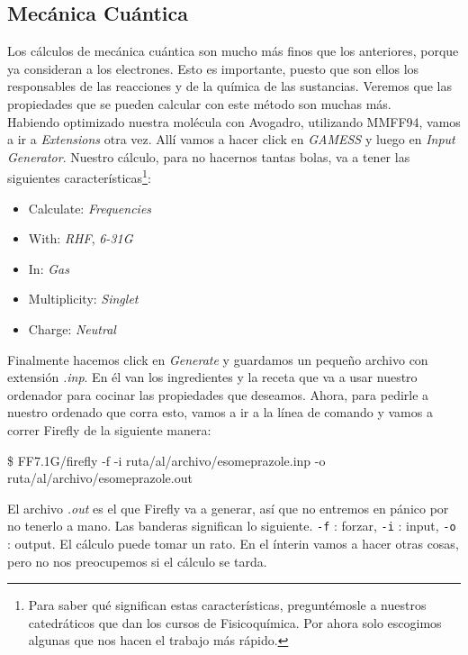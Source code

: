 \documentclass[10pt,letterpaper]{article}
\newcommand{\inlinecode}[1]{
\colorbox{light-gray}{\texttt{#1}}
}
\newenvironment{Code}
{
\begin{lrbox}{\selvestebox}%
\begin{minipage}{\dimexpr\columnwidth-2\fboxsep\relax}
\fontfamily{\ttdefault}\selectfont
}
{\end{minipage}\end{lrbox}%
\begin{center}
\colorbox{light-gray}{\usebox{\selvestebox}}
\end{center}
}
\begin{document}
\subsection{Mec\'anica Cu\'antica}
Los c\'alculos de mec\'anica cu\'antica son mucho m\'as finos que los anteriores, porque ya consideran a los electrones. Esto es importante, puesto que son ellos los responsables de las reacciones y de la qu\'imica de las sustancias. Veremos que las propiedades que se pueden calcular con este m\'etodo son muchas m\'as.\\

Habiendo optimizado nuestra mol\'ecula con Avogadro, utilizando MMFF94, vamos a ir a \emph{Extensions} otra vez. All\'i vamos a hacer click en \emph{GAMESS} y luego en \emph{Input Generator}. Nuestro c\'alculo, para no hacernos tantas bolas, va a tener las siguientes caracter\'isticas\footnote{Para saber qu\'e significan estas caracter\'isticas, pregunt\'emosle a nuestros catedr\'aticos que dan los cursos de Fisicoqu\'imica. Por ahora solo escogimos algunas que nos hacen el trabajo m\'as r\'apido.}:

\begin{itemize}
\item Calculate: \textit{Frequencies}
\item With: \textit{RHF}, \textit{6-31G}
\item In: \textit{Gas}
\item Multiplicity: \textit{Singlet}
\item Charge: \textit{Neutral}
\end{itemize}

Finalmente hacemos click en \emph{Generate} y guardamos un peque\~no archivo con extensi\'on \emph{.inp}. En \'el van los ingredientes y la receta que va a usar nuestro ordenador para cocinar las propiedades que deseamos. Ahora, para pedirle a nuestro ordenado que corra esto, vamos a ir a la l\'inea de comando y vamos a correr Firefly de la siguiente manera:

\begin{Code}
\$ FF7.1G/firefly -f -i ruta/al/archivo/esomeprazole.inp -o ruta/al/archivo/esomeprazole.out
\end{Code}

El archivo \emph{.out} es el que Firefly va a generar, as\'i que no entremos en p\'anico por no tenerlo a mano. Las banderas significan lo siguiente. \inlinecode{-f}: forzar, \inlinecode{-i}: input, \inlinecode{-o}: output. El c\'alculo puede tomar un rato. En el \'interin vamos a hacer otras cosas, pero no nos preocupemos si el c\'alculo se tarda.\\
\end{document}
